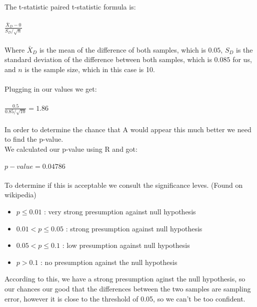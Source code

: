 \documentclass{article}
\begin{document}
The t-statistic paired t-statistic formula is:\\\\
$\frac{\bar{X}_{D} - 0}{S_{D}/\sqrt{n}}$\\\\
Where  $\bar{X}_{D}$ is the mean of the difference of both samples, which is $0.05$, $S_{D}$ is the standard deviation of the difference between both samples, which is $0.085$ for us, and $n$ is the sample size, which in this case is 10.\\\\
Plugging in our values we get:\\\\
$\frac{0.5}{0.85/\sqrt{10}} = 1.86$\\\\
In order to determine the chance that A would appear this much better we need to find the p-value.\\
We calculated our p-value using R and got:\\\\
$p-value = 0.04786$\\\\
To determine if this is acceptable we consult the significance leves. (Found on wikipedia)\\
\begin{itemize}
 \item $p \leq 0.01$  : very strong presumption against null hypothesis\\
 \item $0.01 < p \leq 0.05$  : strong presumption against null hypothesis\\
 \item $0.05 < p \leq 0.1$ : low presumption against null hypothesis\\
 \item $p > 0.1$ : no presumption against the null hypothesis\\
\end{itemize}
According to this, we have a strong presumption aginst the null hypothesis, so our chances our good that the differences between the two samples are sampling error, however it is close to the threshold of 0.05, so we can't be too confident.\\
\end{document}

